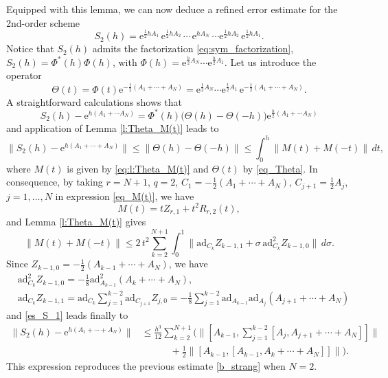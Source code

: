 \documentclass[11pt]{article}
\newcommand{\e}{\ensuremath{\mathrm{e}}}
\newcommand{\ad}{\ensuremath{\mathrm{ad}}}
\begin{document}
Equipped with this lemma, we can now deduce a refined error estimate for the 2nd-order scheme
\[
    S_2(h) = \e^{\frac{1}{2} h A_1} \,  \e^{\frac{1}{2} h A_2} \, \cdots \,  \e^{h A_N} \, \cdots \e^{\frac{1}{2} h A_2} \, \e^{\frac{1}{2} h A_1}.
\]
Notice that $S_2(h)$ admits the factorization \eqref{eq:sym_factorization}, $S_2(h) = \Phi^*(h) \Phi(h)$, with 
$\Phi(h)=\e^{\frac{h}{2} A_N} \cdots \e^{\frac{h}{2} A_1}$. Let us introduce the operator
\begin{equation} \label{eq_Theta}
   \Theta(t)=\Phi(t) \e^{-\frac{t}{2} (A_1+\cdots+A_N)} = \e^{\frac{t}{2} A_N} \cdots \e^{\frac{t}{2} A_1} \, \e^{-\frac{t}{2} (A_1+\cdots+A_N)}.
\end{equation}
A straightforward  calculations shows that
\[
  S_2(h) - \e^{h (A_1 + \cdots A_N)} = \Phi^*(h) \big( \Theta(h) - \Theta(-h) \big) \e^{\frac{h}{2} (A_1 + \cdots A_N)}
\]
and application of Lemma \ref{l:Theta_M(t)} leads to
\begin{equation} \label{es_S_1}
    \|S_2(h) - \e^{h (A_1 + \cdots + A_N)}\| \le \|\Theta(h) - \Theta(-h) \| \le \int_0^h \|M(t) + M(-t)\| \, dt,
\end{equation}
where $M(t)$ is given by \eqref{eq:l:Theta_M(t)} and $\Theta(t)$ by \eqref{eq_Theta}. In consequence, 
by taking $r=N+1$, $q=2$,  $C_1 = -\frac12 (A_1+\cdots+A_N)$, $C_{j+1} = \frac{1}{2}A_j$, $j=1,\ldots,N$ in
expression \eqref{eq_M(t)}, we have
\[
  M(t) = t Z_{r,1} + t^2 R_{r,2}(t),
\]
and Lemma \ref{l:Theta_M(t)} gives
\[
   \|M(t) + M(-t) \| \le 2 \, t^2 \sum_{k=2}^{N+1} \int_0^1 \| \ad_{C_k} Z_{k-1,1} + \sigma \, \ad_{C_k}^2 Z_{k-1,0} \| \, d\sigma.
\]
Since $Z_{k-1,0} =  -\frac{1}{2} (A_{k-1} + \cdots + A_N)$, we have
\[
\begin{aligned}
 & \ad_{C_k}^2 Z_{k-1,0} = -\frac{1}{8} \ad_{A_{k-1}}^2 (A_k + \cdots + A_N), \\
 & \ad_{C_k}  Z_{k-1,1} = \ad_{C_k} \sum_{j=1}^{k-2} \ad_{C_{j+1}} Z_{j,0} = -\frac{1}{8} \sum_{j=1}^{k-2} \ad_{A_{k-1}} \ad_{A_j} (A_{j+1} + \cdots + A_N)
\end{aligned} 
\]
and \eqref{es_S_1} leads finally to
\[
\begin{aligned}
   \|S_2(h) - \e^{h (A_1 + \cdots + A_N)}\| & \le  \frac{h^3}{12} \sum_{k=2}^{N+1} \Big( \big\| [A_{k-1}, \sum_{j=1}^{k-2} [A_j, A_{j+1} + \cdots + A_N]] \big\|   \\
   & \qquad\quad +
   \frac{1}{2} \big\| [A_{k-1}, [A_{k-1}, A_k + \cdots + A_N]] \big\| \Big).
\end{aligned}   
\]   
This expression reproduces the previous estimate \eqref{b_strang} when $N=2$.
\end{document}
